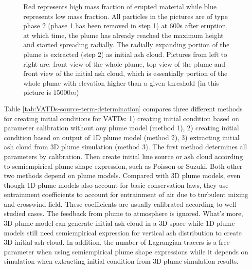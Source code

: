 \begin{figure}[!htb]
\begin{minipage}{.325 \textwidth}
    \end{minipage}%
    \caption{Red represents high mass fraction of erupted material while blue represents low mass fraction. All particles in the pictures are of type phase 2 (phase 1 has been removed in step 1) at 600s after eruption, at which time, the plume has already reached the maximum height and started spreading radially. The radially expanding portion of the plume is extracted (step 2) as initial ash cloud. Pictures from left to right are: front view of the whole plume, top view of the plume and front view of the initial ash cloud, which is essentially portion of the whole plume with elevation higher than a given threshold (in this picture is $15000 m$)}
    \label{fig:Plume-SPH-Pinatubo-ash-cloud}
\end{figure}

Table \ref{tab:VATDs-source-term-determination} compares three different methods for creating initial conditions for VATDs: 1) creating initial condition based on parameter calibration without any plume model (method 1), 2) creating initial condition based on output of 1D plume model (method 2), 3) extracting initial ash cloud from 3D plume simulation (method 3). The first method determines all parameters by calibration. Then create initial line source or ash cloud according to semiempirical plume shape expression, such as Poisson or Suzuki. Both other two methods depend on plume models. Compared with 3D plume models, even though 1D plume models also account for basic conservation laws, they use entrainment coefficients to account for entrainment of air due to turbulent mixing and crosswind field. These coefficients are usually calibrated according to well studied cases. The feedback from plume to atmosphere is ignored. What's more, 3D plume model can generate initial ash cloud in a 3D space while 1D plume models still need semiempirical expression for vertical ash distribution to create 3D initial ash cloud. In addition, the number of Lagrangian tracers is a free parameter when using semiempirical plume shape expressions while it depends on simulation when extracting initial condition from 3D plume simulation results.

